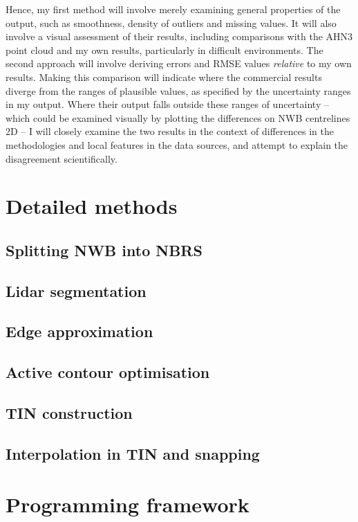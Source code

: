 Hence, my first method will involve merely examining general properties of the output, such as smoothness, density of outliers and missing values. It will also involve a visual assessment of their results, including comparisons with the AHN3 point cloud and my own results, particularly in difficult environments. The second approach will involve deriving errors and RMSE values \textit{relative} to my own results. Making this comparison will indicate where the commercial results diverge from the ranges of plausible values, as specified by the uncertainty ranges in my output. Where their output falls outside these ranges of uncertainty – which could be examined visually by plotting the differences on NWB centrelines 2D – I will closely examine the two results in the context of differences in the methodologies and local features in the data sources, and attempt to explain the disagreement scientifically.

\section{Detailed methods}
\label{sub:methodsdetailed}

\subsection{Splitting NWB into NBRS}
\subsection{Lidar segmentation}
\subsection{Edge approximation}
\subsection{Active contour optimisation}
\subsection{TIN construction}
\subsection{Interpolation in TIN and snapping}

\section{Programming framework}
\label{sub:programming}
